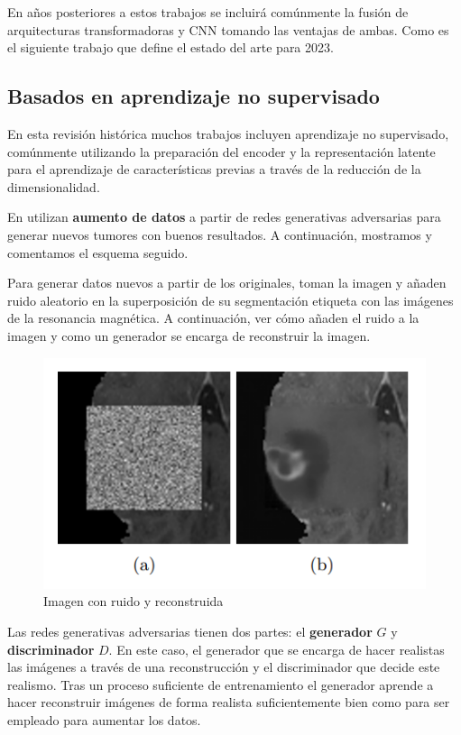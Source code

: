 	En años posteriores a estos trabajos se incluirá comúnmente la fusión de arquitecturas transformadoras y CNN tomando las ventajas de ambas. Como es el siguiente trabajo que define el estado del arte para 2023.
	
	\subsection{Basados en aprendizaje no supervisado}
	
	En esta revisión histórica muchos trabajos incluyen aprendizaje no supervisado, comúnmente utilizando la preparación del encoder y la representación latente para el aprendizaje de características previas a través de la reducción de la dimensionalidad. 
	
	En \cite{ferreira2024we} utilizan \textbf{aumento de datos} a partir de redes generativas adversarias para generar nuevos tumores con buenos resultados. A continuación, mostramos y comentamos el esquema seguido.
	
	Para generar datos nuevos a partir de los originales, toman la imagen y añaden ruido aleatorio en la superposición de su segmentación etiqueta con las imágenes de la resonancia magnética. A continuación, ver cómo añaden el ruido a la imagen y como un generador se encarga de reconstruir la imagen.
	
	\begin{figure}[H]
		\centering
		\includegraphics[width=0.5\linewidth]{imagenes/imagen_faking.png}
		\caption{Imagen con ruido y reconstruida \cite{ferreira2024we}}
	\end{figure}
	
	Las redes generativas adversarias tienen dos partes: el \textbf{generador} $G$ y \textbf{discriminador} $D$. En este caso, el generador que se encarga de hacer realistas las imágenes a través de una reconstrucción y el discriminador que decide este realismo. Tras un proceso suficiente de entrenamiento el generador aprende a hacer reconstruir imágenes de forma realista suficientemente bien como para ser empleado para aumentar los datos.
	
